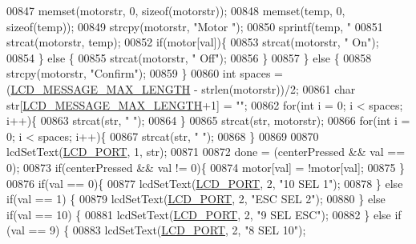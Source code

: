 \begin{DoxyCode}
{{{{{{{{{{{{00847             memset(motorstr, 0, \textcolor{keyword}{sizeof}(motorstr));
00848             memset(temp, 0, \textcolor{keyword}{sizeof}(temp));
00849             strcpy(motorstr, \textcolor{stringliteral}{"Motor "});
00850             sprintf(temp, \textcolor{stringliteral}{"%
00851             strcat(motorstr, temp);
00852             \textcolor{keywordflow}{if}(motor[val])\{
00853                 strcat(motorstr, \textcolor{stringliteral}{" On"});
00854             \} \textcolor{keywordflow}{else} \{
00855                 strcat(motorstr, \textcolor{stringliteral}{" Off"});
00856             \}
00857         \} \textcolor{keywordflow}{else} \{
00858             strcpy(motorstr, \textcolor{stringliteral}{"Confirm"});
00859         \}
00860         \textcolor{keywordtype}{int} spaces = (\hyperlink{lcdmsg_8h_abe4c4b70fc6f44ae3680e5b2c68cdd00}{LCD\_MESSAGE\_MAX\_LENGTH} - strlen(motorstr))/2;
00861         \textcolor{keywordtype}{char} str[\hyperlink{lcdmsg_8h_abe4c4b70fc6f44ae3680e5b2c68cdd00}{LCD\_MESSAGE\_MAX\_LENGTH}+1] = \textcolor{stringliteral}{""};
00862         \textcolor{keywordflow}{for}(\textcolor{keywordtype}{int} i = 0; i < spaces; i++)\{
00863             strcat(str, \textcolor{stringliteral}{" "});
00864         \}
00865         strcat(str, motorstr);
00866         \textcolor{keywordflow}{for}(\textcolor{keywordtype}{int} i = 0; i < spaces; i++)\{
00867             strcat(str, \textcolor{stringliteral}{" "});
00868         \}
00869 
00870         lcdSetText(\hyperlink{lcdmsg_8h_abcf42bd88b3c36193f301ca25b033875}{LCD\_PORT}, 1, str);
00871 
00872         done = (centerPressed && val == 0);
00873         \textcolor{keywordflow}{if}(centerPressed && val != 0)\{
00874             motor[val] = !motor[val];
00875         \}
00876         \textcolor{keywordflow}{if}(val == 0)\{
00877             lcdSetText(\hyperlink{lcdmsg_8h_abcf42bd88b3c36193f301ca25b033875}{LCD\_PORT}, 2, \textcolor{stringliteral}{"10     SEL     1"});
00878         \} \textcolor{keywordflow}{else} \textcolor{keywordflow}{if}(val == 1) \{
00879             lcdSetText(\hyperlink{lcdmsg_8h_abcf42bd88b3c36193f301ca25b033875}{LCD\_PORT}, 2, \textcolor{stringliteral}{"ESC    SEL     2"});
00880         \} \textcolor{keywordflow}{else} \textcolor{keywordflow}{if}(val == 10) \{
00881             lcdSetText(\hyperlink{lcdmsg_8h_abcf42bd88b3c36193f301ca25b033875}{LCD\_PORT}, 2, \textcolor{stringliteral}{"9      SEL   ESC"});
00882         \} \textcolor{keywordflow}{else} \textcolor{keywordflow}{if} (val == 9) \{
00883             lcdSetText(\hyperlink{lcdmsg_8h_abcf42bd88b3c36193f301ca25b033875}{LCD\_PORT}, 2, \textcolor{stringliteral}{"8      SEL    10"});
}}}}}}}}}}}}}
\end{DoxyCode}
